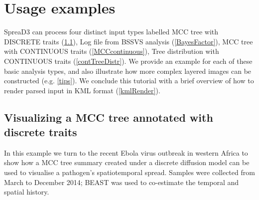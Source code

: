 \documentclass[english]{paper}
\begin{document}
\section{Usage examples}

SpreaD3 can process four distinct input types labelled MCC tree with DISCRETE traits (\ref{discrete}), Log file from BSSVS analysis (\ref{BayesFactor}), MCC tree with CONTINUOUS traits (\ref{MCCcontinuous}), Tree distribution with CONTINUOUS traits (\ref{contTreeDistr}). 
We provide an example for each of these basic analysis types, and also illustrate how more complex layered images can be constructed (e.g. \ref{tips}). 
We conclude this tutorial with a brief overview of how to render parsed input in KML format (\ref{kmlRender}).

\subsection{Visualizing a MCC tree annotated with discrete traits}
\label{discrete}
In this example we turn to the recent Ebola virus outbreak in western Africa to show how a MCC tree summary created under a discrete diffusion model \citep{lemey:2009fk} can be used to visualise a pathogen's spatiotemporal spread. 
Samples were collected from March to December 2014; BEAST \citep{drummond:2012zr} was used to co-estimate the temporal and spatial history. 
\end{document}
